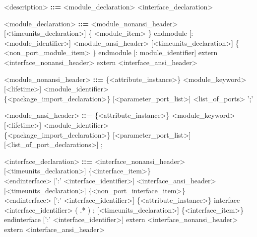 \documentclass{article}
\begin{document}
\begin{grammar}
    <description> \textbf{::=} <module_declaration>
                               \alt <interface_declaration>
\end{grammar}

\begin{grammar}
    <module_declaration> \textbf{::=} <module_nonansi_header> [<timeunits_declaration>] \{ <module_item> \} endmodule
                                      [: <module_identifier>]
                                      \alt <module_ansi_header> [<timeunits_declaration>] \{ <non_port_module_item> \} endmodule
                                      [: module_identifier]
                                      \alt extern <interface_nonansi_header>
                                      \alt extern <interface_ansi_header>
\end{grammar}

\begin{grammar}
    <module_nonansi_header> \textbf{::=} \{<attribute_instance>\} <module_keyword> [<lifetime>] <module_identifier> \\
                                         \{<package_import_declaration>\} [<parameter_port_list>] <list_of_ports> ';'
\end{grammar}

\begin{grammar}
    <module_ansi_header> \textbf{::=} \{<attribute_instance>\} <module_keyword> [<lifetime>] <module_identifier> \\
                                      \{<package_import_declaration>\} [<parameter_port_list>] [<list_of_port_declarations>] ;
\end{grammar}

\begin{grammar}
    <interface_declaration> \textbf{::=} <interface_nonansi_header> [<timeunits_declaration>] \{<interface_item>\} \\
                                         <endinterface> [':' <interface_identifier>]
                                         \alt <interface_ansi_header> [<timeunits_declaration>] \{<non_port_interface_item>\} \\
                                         <endinterface> [':' <interface_identifier>]
                                         \alt \{<attribute_instance>\} interface <interface_identifier> ( .* ) ;
                                         [<timeunits_declaration>] \{<interface_item>\} endinterface [':' <interface_identifier>]
                                         \alt extern <interface_nonansi_header>
                                         \alt extern <interface_ansi_header>
\end{grammar}
\end{document}
